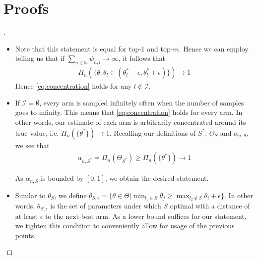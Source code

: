 \section{Proofs}\label{section:txts_proofs}
\begin{proof}[]
  \begin{itemize}
  \item Note that this statement is equal for top-1 and top-$m$. Hence we can
  employ  telling us that if $\sum_{n \in \mathbb{N}}
  \psi_{n, l} \rightarrow \infty$, it follows that
  \begin{align}
    \Pi_n(\{\theta: \theta_l \in (\theta^*_l - \epsilon, \theta^*_l +
        \epsilon)\}) \rightarrow 1 \label{eq:concentration}
  \end{align}
  Hence \eqref{eq:concentration} holds for any $l \notin \mathcal{I}$. \item If
  $\mathcal{I} = \emptyset$, every arm is sampled infinitely often when the
  number of samples goes to infinity. This means that \eqref{eq:concentration}
  holds for every arm. In other words, our estimate of each arm is arbitrarily
  concentrated around its true value, i.e. $\Pi_n(\{\theta^*\}) \rightarrow 1$.
  Recalling our definitions of $S^*$, $\Theta_S$ and $\alpha_{n, S}$, we see
  that
  \begin{align}
    \alpha_{n, S^*} = \Pi_n(\Theta_{S^*}) \geq \Pi_n(\{\theta^*\}) \rightarrow 1
  \end{align}

  As $\alpha_{n, S}$ is bounded by $[0, 1]$, we obtain the desired statement.

  \item Similar to $\theta_S$, we define $\theta_{S, \epsilon} = \{\theta \in
  \Theta | \min_{l_1 \in S} \theta_j \geq \max_{l_2 \notin S} \theta_i +
  \epsilon\}$. In other words, $\theta_{S,\epsilon}$ is the set of parameters
  under which $S$ optimal with a distance of at least $\epsilon$ to the
  next-best arm. As a lower bound suffices for our statement, we tighten this
  condition to conveniently allow for usage of the previous points.


\end{itemize}
\end{proof}

